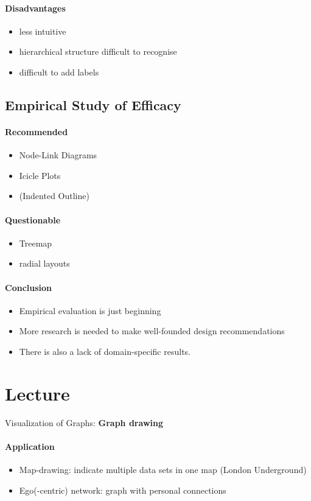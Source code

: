 \documentclass[10pt,a4paper]{article}
\begin{document}
	\paragraph{Disadvantages}
	\begin{itemize}
		\item less intuitive
		\item hierarchical structure difficult to recognise
		\item difficult to add labels
	\end{itemize}

	\subsection{Empirical Study of Efficacy}
		\paragraph{Recommended}
		\begin{itemize}
			\item Node-Link Diagrams
			\item Icicle Plots
			\item (Indented Outline)
		\end{itemize}
		\paragraph{Questionable}
		\begin{itemize}
			\item Treemap
			\item radial layouts
		\end{itemize}
		\paragraph{Conclusion}
		\begin{itemize}
			\item Empirical evaluation is just beginning
			\item More research is needed to make well-founded design recommendations
			\item There is also a lack of domain-specific results.
		\end{itemize}
	
\section{Lecture}
	Visualization of Graphs: \textbf{Graph drawing}
	\paragraph{Application}
	\begin{itemize}
		\item Map-drawing: indicate multiple data sets in one map (London Underground)
		\item Ego(-centric) network: graph with personal connections 
	\end{itemize}
	
\end{document}
